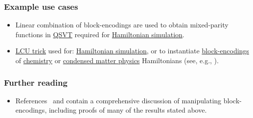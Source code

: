 \begin{refsection}

\subsubsection*{Example use cases}

\begin{itemize}
    \item Linear combination of block-encodings are used to obtain mixed-parity functions in \hyperref[prim:QSVT]{QSVT} required for \hyperref[prim:QSPqubitization]{Hamiltonian simulation}.
    \item \hyperref[prim:LCU]{LCU trick} used for: \hyperref[prim:TaylorDyson]{Hamiltonian simulation}, or to instantiate \hyperref[prim:BlockEncodings]{block-encodings} of \hyperref[appl:ElectronicStructure]{chemistry} or \hyperref[appl:CondensedMatter]{condensed matter physics} Hamiltonians (see, e.g., \cite{babbush2018EncodingElectronicSpectraLinearT,Wan2021exponentiallyfaster}). 
\end{itemize}


\subsubsection*{Further reading}

\begin{itemize}
    \item References~\cite[Section 3.3]{gilyen2018QSingValTransfThesis} and \cite[Section 7.3]{lin2022LectureNotes} contain a comprehensive discussion of manipulating block-encodings, including proofs of many of the results stated above.
\end{itemize}
\printbibliography[heading=secbib,segment=\therefsegment]

\end{refsection}

\newpage



